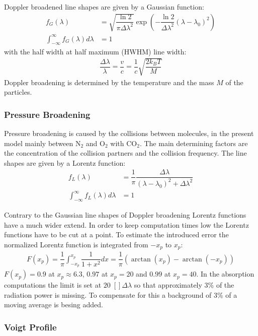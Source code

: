 \begin{itemize}
\begin{itemize}
Doppler broadened line shapes are given by a Gaussian function:
\begin{align}
	f_G(\lambda) &= \sqrt{\dfrac{\ln 2}{\pi \Delta \lambda^2}}
		\exp \left(- \dfrac{\ln 2}{\Delta \lambda^2}  \left(\lambda - \lambda_0\right)^2 \right) \\
			\int_{-\infty}^{\infty}  f_G(\lambda) d\lambda &= 1
\end{align}
with the half width at half maximum (HWHM) line width:
\begin{align}
\dfrac{\Delta \lambda}{\lambda} = \dfrac{v}{c} = \dfrac{1}{c} \sqrt{\dfrac{2 k_B T}{M}}
\end{align}
Doppler broadening is  determined by the temperature and the mass $M$ of the particles.

\subsubsection{Pressure Broadening}

Pressure broadening is caused by the collisions between molecules, in the present model mainly between $\mathrm{N}_2$ and $\mathrm{O}_2$ with $\mathrm{CO}_2$. 
The main determining factors are the concentration of the collision partners and the collision frequency. The line shapes are given by a Lorentz function:
\begin{align}
	f_L(\lambda) &= \dfrac{1}{\pi} \dfrac{\Delta \lambda}{ (\lambda - \lambda_0)^2 + \Delta \lambda^2} \\
	\int_{-\infty}^{\infty}  f_L(\lambda) d\lambda &= 1
\end{align}

Contrary to the Gaussian line shapes of Doppler broadening Lorentz functions have a much wider extend. In order to keep computation times low the Lorentz functions have to be cut at a point. To estimate the introduced error the normalized Lorentz function is integrated from $-x_p$ to $x_p$:
\begin{align}
	F(x_p) = \dfrac{1}{\pi} \int_{-x_p}^{x_p} \dfrac{1}{1 + x^2} dx = \dfrac{1}{\pi} \left(\arctan(x_p) - \arctan(-x_p)\right)
\end{align}
$F(x_p) = 0.9$ at $x_p \approx 6.3$, $0.97$ at $x_p = 20$ and $0.99$ at $x_p = 40$. In the absorption computations the limit is set at  $20\;[] \Delta \lambda$ so that approximately 3\% of the radiation power is missing. To compensate for this a background of 3\% of a moving average is besing added.

\subsubsection{Voigt Profile}


\end{itemize}
\end{itemize}
